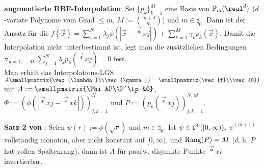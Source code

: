 \linie

\textbf{augmentierte RBF-Interpolation}:
Sei $\{p_k\}_{k=1}^M$ eine Basis von $\PP_m(\real^d)$
($d$-variate Polynome vom Grad $\le m$, $M := \binom{m+d}{m}$) und $m \in \natural_0$.
Dann ist der Ansatz für die 
$f(\vec{x}) = \sum_{i=1}^N \lambda_j \phi(|\vec{x} - \vec*{x}{j}|) +
\sum_{k=1}^M \gamma_k p_k(\vec{x})$.
Damit die Interpolation nicht unterbestimmt ist, legt man die
zusätzlichen Bedingungen $\forall_{k=1,\dotsc,M}\; \sum_{j=1}^N \lambda_j p_k(\vec*{x}{j}) = 0$
fest.\\
Man erhält das Interpolations-LGS
$A\smallpmatrix{\vec{\lambda}\\\vec{\gamma}} = \smallpmatrix{\vec{f}\\\vec{0}}$ mit
$A := \smallpmatrix{\Phi&P\\P^\tp&0}$, $\Phi := (\phi(|\vec*{x}{j} - \vec*{x}{k}|))_{j,k=1}^N$ und
$P := (p_k(\vec*{x}{j}))_{j,k=1}^{N,M}$.

\textbf{Satz 2 von }:
Seien $\psi(r) := \phi(\sqrt{r})$ und $m \in \natural_0$.
Ist $\psi \in \mathcal{C}^0([0, \infty))$,
$\psi^{(m+1)}$ vollständig monoton, aber nicht konstant auf $[0, \infty)$, und
$\text{Rang}(P) = M$ (d.\,h. $P$ hat vollen Spaltenrang),
dann ist $A$ für paarw. disjunkte Punkte $\vec*{x}{i}$ invertierbar.

\pagebreak
